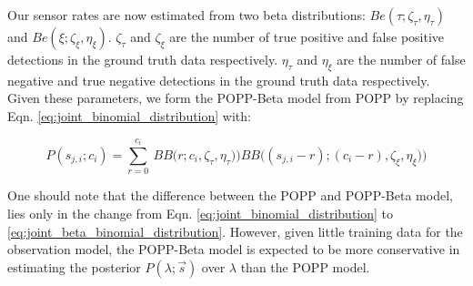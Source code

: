Our sensor rates are now estimated from two beta distributions: $Be(\tau ; \zeta_{\tau}, \eta_{\tau})$ and $Be(\xi ; \zeta_{\xi}, \eta_{\xi})$.
% 
$\zeta_{\tau}$ and $\zeta_{\xi}$ are the number of true positive and false positive detections in the ground truth data respectively.
% 
$\eta_{\tau}$ and $\eta_{\xi}$ are the number of false negative and true  negative detections in the ground truth data respectively. 
% 
Given these parameters, we form the POPP-Beta model from POPP by replacing Eqn. \ref{eq:joint_binomial_distribution} with:  

\begin{equation}
	\label{eq:joint_beta_binomial_distribution}
    P(s_{j,i} ; c_i) \! = \! \! \! \displaystyle\sum_{r = 0}^{c_{i}} \! \! ~ BB\Big(r ; c_i, \zeta_{\tau}, \eta_{\tau}) \Big) BB\Big( (s_{j,i} - r) ; (c_i - r), \zeta_{\xi}, \eta_{\xi}) \Big)
\end{equation}



One should note that the difference between the POPP and POPP-Beta model, lies only in the change from Eqn. \ref{eq:joint_binomial_distribution} to \ref{eq:joint_beta_binomial_distribution}. However, given little training data for the observation model, the POPP-Beta model is expected to be more conservative in estimating the posterior $P(\lambda ; \vec{s})$ over $\lambda$ than the POPP model. 

